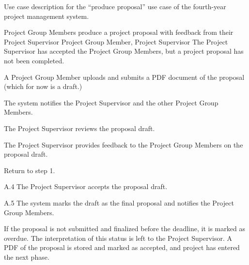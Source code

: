 \begin{table}
  \centering
  \caption{Use case description for the ``produce proposal'' use case of the fourth-year project management system.}
  \label{tbl:use-case-produce-proposal}

  \begin{usecase}
    Project Group Members produce a project proposal with feedback from their Project Supervisor
    Project Group Member, Project Supervisor
    The Project Supervisor has accepted the Project Group Members, but a project proposal has not been completed.
    \ucnormal
    \begin{ucenum}
      \item A Project Group Member uploads and submits a PDF document of the proposal (which for now is a draft.)
      \item The system notifies the Project Supervisor and the other Project Group Members.
      \item The Project Supervisor reviews the proposal draft.
      \item The Project Supervisor provides feedback to the Project Group Members on the proposal draft.
      \item Return to step 1.
    \end{ucenum}
    \begin{ucenum}
      \item [A.4] The Project Supervisor accepts the proposal draft.
      \item [A.5] The system marks the draft as the final proposal and notifies the Project Group Members.
    \end{ucenum}
    If the proposal is not submitted and finalized before the deadline, it is marked as overdue. The interpretation of this status is left to the Project Supervisor.
    A PDF of the proposal is stored and marked as accepted, and project has entered the next phase.
  \end{usecase}
\end{table}


